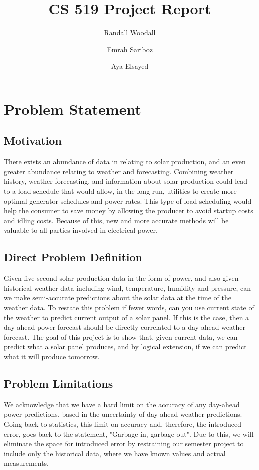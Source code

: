 \documentclass[sigconf]{acmart}
\begin{document}
\title{CS 519 Project Report}

\author{Randall Woodall}

\author{Emrah Sariboz}

\author{Aya Elsayed}

\maketitle

\section{Problem Statement}

\subsection{Motivation}
There exists an abundance of data in relating to solar production, and an even greater abundance relating to weather and forecasting.  Combining weather history, weather forecasting, and information about solar production could lead to a load schedule that would allow, in the long run, utilities to create more optimal generator schedules and power rates.  This type of load scheduling would help the consumer to save money by allowing the producer to avoid startup costs and idling costs.  Because of this, new and more accurate methods will be valuable to all parties involved in electrical power.

\subsection{Direct Problem Definition}
Given five second solar production data in the form of power, and also given historical weather data including wind, temperature, humidity and pressure, can we make semi-accurate predictions about the solar data at the time of the weather data.  To restate this problem if fewer words, can you use current state of the weather to predict current output of a solar panel.  If this is the case, then a day-ahead power forecast should be directly correlated to a day-ahead weather forecast.  The goal of this project is to show that, given current data, we can predict what a solar panel produces, and by logical extension, if we can predict what it will produce tomorrow.

\subsection{Problem Limitations}
We acknowledge that we have a hard limit on the accuracy of any day-ahead power predictions, based in the uncertainty of day-ahead weather predictions.  Going back to statistics, this limit on accuracy and, therefore, the introduced error, goes back to the statement, "Garbage in, garbage out".  Due to this, we will eliminate the space for introduced error by restraining our semester project to include only the historical data, where we have known values and actual measurements.
\end{document}
